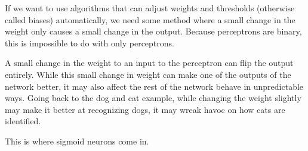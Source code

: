  If we want to use algorithms that can adjust weights and thresholds (otherwise called biases) automatically, we need some method where a small change in the weight only causes a small change in the output.
Because perceptrons are binary, this is impossible to do with only perceptrons.

  A small change in the weight to an input to the perceptron can flip the output entirely.
While this small change in weight can make one of the outputs of the network better, it may also affect the rest of the network behave in unpredictable ways.
Going back to the dog and cat example, while changing the weight slightly may make it better at recognizing dogs, it may wreak havoc on how cats are identified.

  This is where sigmoid neurons come in.